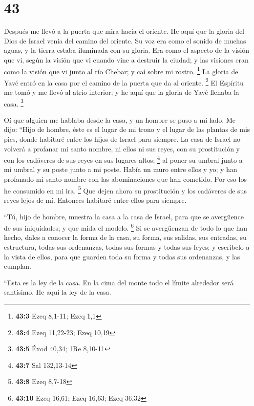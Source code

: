 \hypertarget{section-42}{%
\section{43}\label{section-42}}

 Después me llevó a la puerta que mira hacia el oriente.
 He aquí que la gloria del Dios de Israel venía del camino
del oriente. Su voz era como el sonido de muchas aguas, y la tierra
estaba iluminada con su gloria.  Era como el aspecto de la
visión que vi, según la visión que vi cuando vine a destruir la ciudad;
y las visiones eran como la visión que vi junto al río Chebar; y caí
sobre mi rostro. \footnote{\textbf{43:3} Ezeq 8,1-11; Ezeq 1,1}
 La gloria de Yavé entró en la casa por el camino de la
puerta que da al oriente. \footnote{\textbf{43:4} Ezeq 11,22-23; Ezeq
  10,19}  El Espíritu me tomó y me llevó al atrio
interior; y he aquí que la gloria de Yavé llenaba la casa. \footnote{\textbf{43:5}
  Éxod 40,34; 1Re 8,10-11}

 Oí que alguien me hablaba desde la casa, y un hombre se
puso a mi lado.  Me dijo: ``Hijo de hombre, éste es el
lugar de mi trono y el lugar de las plantas de mis pies, donde habitaré
entre los hijos de Israel para siempre. La casa de Israel no volverá a
profanar mi santo nombre, ni ellos ni sus reyes, con su prostitución y
con los cadáveres de sus reyes en sus lugares altos; \footnote{\textbf{43:7}
  Sal 132,13-14}  al poner su umbral junto a mi umbral y
su poste junto a mi poste. Había un muro entre ellos y yo; y han
profanado mi santo nombre con las abominaciones que han cometido. Por
eso los he consumido en mi ira. \footnote{\textbf{43:8} Ezeq 8,7-18}
 Que dejen ahora su prostitución y los cadáveres de sus
reyes lejos de mí. Entonces habitaré entre ellos para siempre.

 ``Tú, hijo de hombre, muestra la casa a la casa de
Israel, para que se avergüence de sus iniquidades; y que mida el modelo.
\footnote{\textbf{43:10} Ezeq 16,61; Ezeq 16,63; Ezeq 36,32}
 Si se avergüenzan de todo lo que han hecho, dales a
conocer la forma de la casa, su forma, sus salidas, sus entradas, su
estructura, todas sus ordenanzas, todas sus formas y todas sus leyes; y
escríbelo a la vista de ellos, para que guarden toda su forma y todas
sus ordenanzas, y las cumplan.

 ``Esta es la ley de la casa. En la cima del monte todo
el límite alrededor será santísimo. He aquí la ley de la casa.

